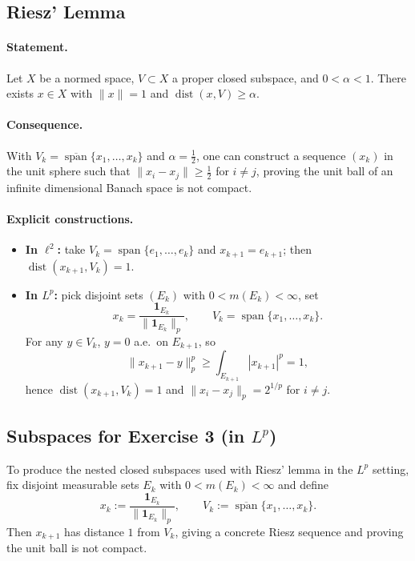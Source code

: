 \documentclass[12pt,a4paper]{article}
\theoremstyle{plain}
\theoremstyle{definition}
\theoremstyle{remark}
\theoremstyle{remark}
\theoremstyle{definition}
\begin{document}
	\bigskip
	
	\subsection*{Riesz' Lemma}
	
	\paragraph{Statement.}
	Let $X$ be a normed space, $V\subset X$ a proper closed subspace, and $0<\alpha<1$.
	There exists $x\in X$ with $\|x\|=1$ and $\operatorname{dist}(x,V)\ge \alpha$.
	
	\paragraph{Consequence.}
	With $V_k=\overline{\operatorname{span}}\{x_1,\dots,x_k\}$ and $\alpha=\tfrac12$,
	one can construct a sequence $(x_k)$ in the unit sphere such that
	$\|x_i-x_j\|\ge \tfrac12$ for $i\ne j$, proving the unit ball of an infinite dimensional Banach space is not compact.
	
	\paragraph{Explicit constructions.}
	\begin{itemize}
		\item \textbf{In $\ell^2$:} take $V_k=\operatorname{span}\{e_1,\dots,e_k\}$ and $x_{k+1}=e_{k+1}$;
		then $\operatorname{dist}(x_{k+1},V_k)=1$.
		\item \textbf{In $L^p$:} pick disjoint sets $(E_k)$ with $0<m(E_k)<\infty$, set
		\[
		x_k=\frac{\mathbf 1_{E_k}}{\|\mathbf 1_{E_k}\|_p},\qquad V_k=\operatorname{span}\{x_1,\dots,x_k\}.
		\]
		For any $y\in V_k$, $y=0$ a.e.\ on $E_{k+1}$, so
		\[
		\|x_{k+1}-y\|_p^p \ge \int_{E_{k+1}} |x_{k+1}|^p = 1,
		\]
		hence $\operatorname{dist}(x_{k+1},V_k)=1$ and $\|x_i-x_j\|_p=2^{1/p}$ for $i\ne j$.
	\end{itemize}
	
	\bigskip
	
	\subsection*{Subspaces for Exercise 3 (in $L^p$)}
	
	To produce the nested closed subspaces used with Riesz' lemma in the $L^p$ setting, fix disjoint measurable sets
	$E_k$ with $0<m(E_k)<\infty$ and define
	\[
	x_k:=\frac{\mathbf 1_{E_k}}{\|\mathbf 1_{E_k}\|_p},\qquad
	V_k:=\overline{\operatorname{span}}\{x_1,\dots,x_k\}.
	\]
	Then $x_{k+1}$ has distance $1$ from $V_k$, giving a concrete Riesz sequence and proving the unit ball is not compact.
	
\end{document}
